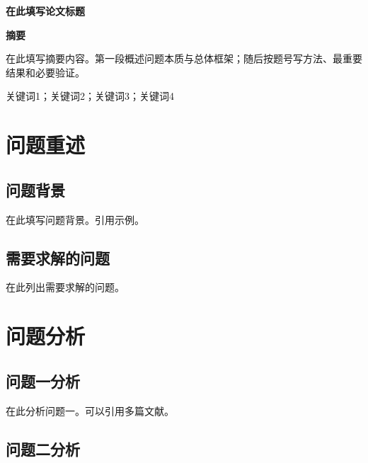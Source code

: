 \documentclass[12pt,a4paper]{article}
\newcommand{\PaperTitle}{在此填写论文标题}
\begin{document}
\thispagestyle{plain}
\begin{center}
  {\fontsize{16pt}{24pt}\selectfont\bfseries\heitifont \PaperTitle\par}
\end{center}
\begin{center}
  {\fontsize{14pt}{21pt}\selectfont\bfseries 摘\quad 要}
\end{center}\vspace{0.6cm}

在此填写摘要内容。第一段概述问题本质与总体框架；随后按题号写方法、最重要结果和必要验证。

关键词1；关键词2；关键词3；关键词4

\newpage
\tableofcontents
\newpage

\setcounter{page}{1}

\section{问题重述}

\subsection{问题背景}

在此填写问题背景。引用示例\cite{Si2020}。

\subsection{需要求解的问题}

在此列出需要求解的问题。

\section{问题分析}

\subsection{问题一分析}

在此分析问题一。可以引用多篇文献\cite{Hoerl1970,Bishop2006}。

\subsection{问题二分析}
\end{document}
